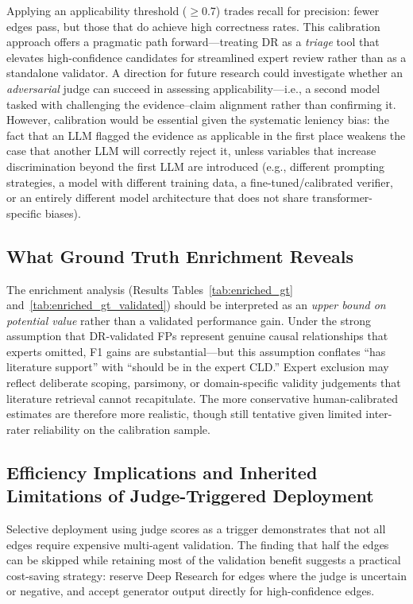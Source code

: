 Applying an applicability threshold ($\geq$0.7) trades recall for precision: fewer edges pass, but those that do achieve high correctness rates. This calibration approach offers a pragmatic path forward---treating DR as a \emph{triage} tool that elevates high-confidence candidates for streamlined expert review rather than as a standalone validator. A direction for future research could investigate whether an \emph{adversarial} judge can succeed in assessing applicability---i.e., a second model tasked with challenging the evidence--claim alignment rather than confirming it. However, calibration would be essential given the systematic leniency bias: the fact that an LLM flagged the evidence as applicable in the first place weakens the case that another LLM will correctly reject it, unless variables that increase discrimination beyond the first LLM are introduced (e.g., different prompting strategies, a model with different training data, a fine-tuned/calibrated verifier, or an entirely different model architecture that does not share transformer-specific biases).

\subsection{What Ground Truth Enrichment Reveals}

The enrichment analysis (Results Tables~\ref{tab:enriched_gt} and~\ref{tab:enriched_gt_validated}) should be interpreted as an \emph{upper bound on potential value} rather than a validated performance gain. Under the strong assumption that DR-validated FPs represent genuine causal relationships that experts omitted, F1 gains are substantial---but this assumption conflates ``has literature support'' with ``should be in the expert CLD.'' Expert exclusion may reflect deliberate scoping, parsimony, or domain-specific validity judgements that literature retrieval cannot recapitulate. The more conservative human-calibrated estimates are therefore more realistic, though still tentative given limited inter-rater reliability on the calibration sample.

\subsection{Efficiency Implications and Inherited Limitations of Judge-Triggered Deployment}

Selective deployment using judge scores as a trigger demonstrates that not all edges require expensive multi-agent validation. The finding that half the edges can be skipped while retaining most of the validation benefit suggests a practical cost-saving strategy: reserve Deep Research for edges where the judge is uncertain or negative, and accept generator output directly for high-confidence edges.

